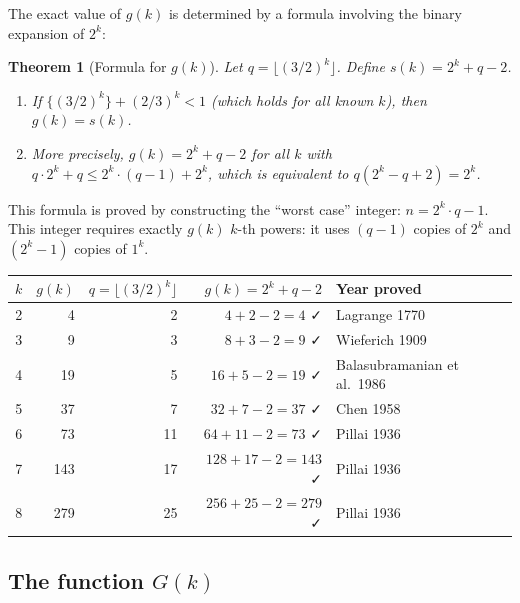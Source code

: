 \documentclass[12pt,a4paper]{amsart}
\newtheorem{theorem}{Theorem}[section]
\theoremstyle{definition}
\begin{document}
The exact value of $g(k)$ is determined by a formula involving the
binary expansion of $2^k$:

\begin{theorem}[Formula for $g(k)$]\label{thm:gk_formula}
  Let $q = \lfloor (3/2)^k \rfloor$.  Define $s(k) = 2^k + q - 2$.
  \begin{enumerate}
    \item If $\{(3/2)^k\} + (2/3)^k < 1$ (which holds for all known $k$),
      then $g(k) = s(k)$.
    \item More precisely, $g(k) = 2^k + q - 2$ for all $k$ with
      $q \cdot 2^k + q \leq 2^k \cdot (q-1) + 2^k$, which is
      equivalent to $q(2^k - q + 2) = 2^k$.
  \end{enumerate}
\end{theorem}

This formula is proved by constructing the ``worst case'' integer:
$n = 2^k \cdot q - 1$.  This integer requires exactly $g(k)$ $k$-th powers:
it uses $(q-1)$ copies of $2^k$ and $(2^k - 1)$ copies of $1^k$.

\begin{center}
\begin{tabular}{rrrrl}
\toprule
$k$ & $g(k)$ & $q = \lfloor(3/2)^k\rfloor$ & $g(k) = 2^k + q - 2$ & Year proved \\
\midrule
2 & 4 & 2 & $4+2-2=4$ ✓ & Lagrange 1770 \\
3 & 9 & 3 & $8+3-2=9$ ✓ & Wieferich 1909 \\
4 & 19 & 5 & $16+5-2=19$ ✓ & Balasubramanian et al.\ 1986 \\
5 & 37 & 7 & $32+7-2=37$ ✓ & Chen 1958 \\
6 & 73 & 11 & $64+11-2=73$ ✓ & Pillai 1936 \\
7 & 143 & 17 & $128+17-2=143$ ✓ & Pillai 1936 \\
8 & 279 & 25 & $256+25-2=279$ ✓ & Pillai 1936 \\
\bottomrule
\end{tabular}
\end{center}

\subsection{The function $G(k)$}
\end{document}
